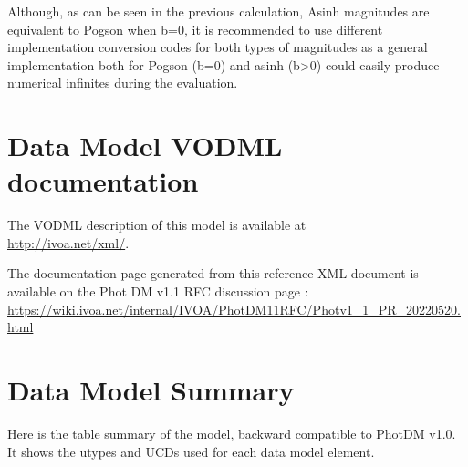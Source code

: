 \documentclass[11pt,a4paper]{ivoa}
\begin{document}
\begin{appendices}
Although, as can be seen in the previous calculation, Asinh magnitudes are equivalent to Pogson
when b=0, it is recommended to use different implementation conversion codes for both types of magnitudes as a general implementation both for Pogson (b=0) and asinh (b>0) could easily produce numerical infinites during the evaluation.
\par

\section{Data Model VODML documentation}

The VODML description of this model is available at \\ \url{http://ivoa.net/xml/}.

The documentation page generated from this reference XML document is available on the Phot DM v1.1 RFC discussion page : \\
\url{https://wiki.ivoa.net/internal/IVOA/PhotDM11RFC/Photv1_1_PR_20220520.html}

\section{Data Model Summary}
Here is the table summary  of the model, backward compatible to PhotDM v1.0. 
It shows the utypes and UCDs used for each data model element. 



\end{appendices}
\end{document}
